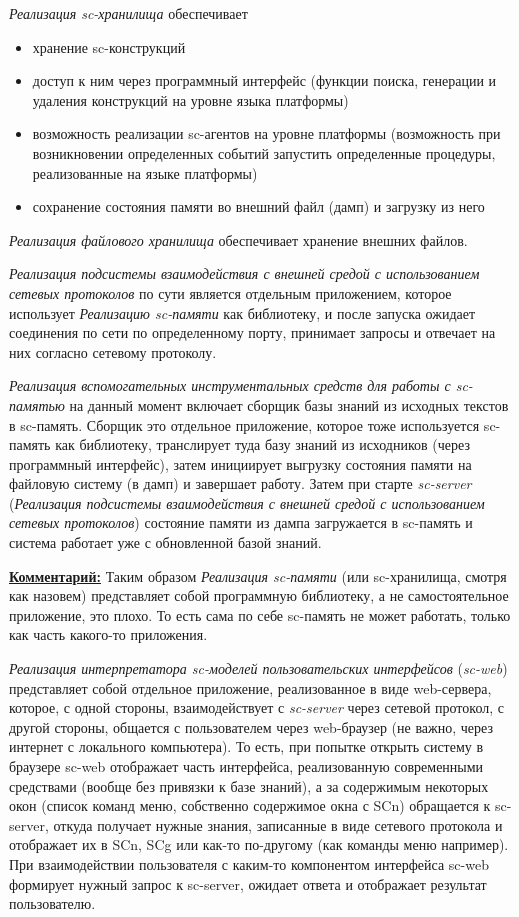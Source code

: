 \textit{Реализация sc-хранилища} обеспечивает
\begin{itemize}
	\item хранение sc-конструкций
	\item доступ к ним через программный интерфейс (функции поиска, генерации и удаления конструкций на уровне языка платформы)
	\item возможность реализации sc-агентов на уровне платформы (возможность при возникновении определенных событий запустить определенные процедуры, реализованные на языке платформы)
	\item сохранение состояния памяти во внешний файл (дамп) и загрузку из него
\end{itemize}

\textit{Реализация файлового хранилища} обеспечивает хранение внешних файлов.

\textit{Реализация подсистемы взаимодействия с внешней средой с использованием сетевых протоколов} по сути является отдельным приложением, которое использует \textit{Реализацию sc-памяти} как библиотеку, и после запуска ожидает соединения по сети по определенному порту, принимает запросы и отвечает на них согласно сетевому протоколу.

\textit{Реализация вспомогательных инструментальных средств для работы с sc-памятью} на данный момент включает сборщик базы знаний из исходных текстов в sc-память. Сборщик это отдельное приложение, которое тоже используется sc-память как библиотеку, транслирует туда базу знаний из исходников (через программный интерфейс), затем инициирует выгрузку состояния памяти на файловую систему (в дамп) и завершает работу. Затем при старте \textit{sc-server} (\textit{Реализация подсистемы взаимодействия с внешней средой с использованием сетевых протоколов}) состояние памяти из дампа загружается в sc-память и система работает уже с обновленной базой знаний.

\textbf{\uline{Комментарий:}}
Таким образом \textit{Реализация sc-памяти} (или sc-хранилища, смотря как назовем) представляет собой программную библиотеку, а не самостоятельное приложение, это плохо. То есть сама по себе sc-память не может работать, только как часть какого-то приложения.

\textit{Реализация интерпретатора sc-моделей пользовательских интерфейсов} (\textit{sc-web}) представляет собой отдельное приложение, реализованное в виде web-сервера, которое, с одной стороны, взаимодействует с \textit{sc-server} через сетевой протокол, с другой стороны, общается с пользователем через web-браузер (не важно, через интернет с локального компьютера). То есть, при попытке открыть систему в браузере sc-web отображает часть интерфейса, реализованную современными средствами (вообще без привязки к базе знаний), а за содержимым некоторых окон (список команд меню, собственно содержимое окна с SCn) обращается к sc-server, откуда получает нужные знания, записанные в виде сетевого протокола и отображает их в SCn, SCg или как-то по-другому (как команды меню например).
При взаимодействии пользователя с каким-то компонентом интерфейса sc-web формирует нужный запрос к sc-server, ожидает ответа и отображает результат пользователю.

